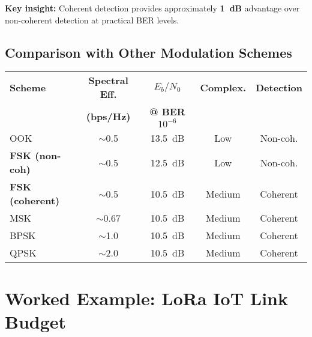 \textbf{Key insight:} Coherent detection provides approximately \textbf{1~dB} advantage over non-coherent detection at practical BER levels.

\subsection{Comparison with Other Modulation Schemes}

\begin{center}
\small
\begin{tabular}{@{}lcccc@{}}
\toprule
\textbf{Scheme} & \textbf{Spectral Eff.} & \textbf{$E_b/N_0$} & \textbf{Complex.} & \textbf{Detection} \\
 & \textbf{(bps/Hz)} & \textbf{@ BER $10^{-6}$} & & \\
\midrule
OOK & $\sim$0.5 & 13.5~dB & Low & Non-coh. \\
\textbf{FSK (non-coh)} & $\sim$0.5 & 12.5~dB & Low & Non-coh. \\
\textbf{FSK (coherent)} & $\sim$0.5 & 10.5~dB & Medium & Coherent \\
MSK & $\sim$0.67 & 10.5~dB & Medium & Coherent \\
BPSK & $\sim$1.0 & 10.5~dB & Medium & Coherent \\
QPSK & $\sim$2.0 & 10.5~dB & Medium & Coherent \\
\bottomrule
\end{tabular}
\end{center}

\section{Worked Example: LoRa IoT Link Budget}


